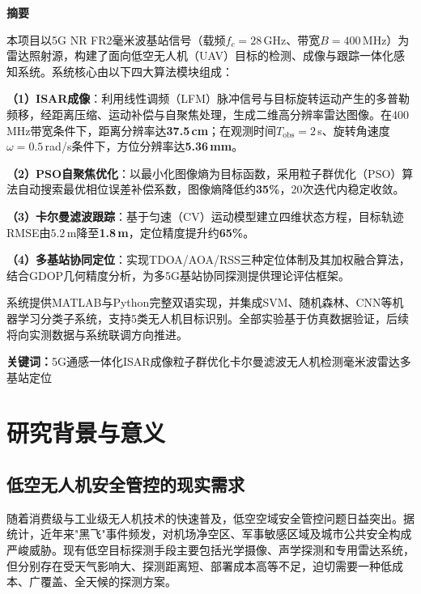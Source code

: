 \documentclass[12pt, a4paper]{article}
\begin{document}
\begin{infobox}
{\bfseries\large\color{primary} 摘\quad 要}

\medskip
本项目以5G NR FR2毫米波基站信号（载频$f_c=28\,$GHz、带宽$B=400\,$MHz）为雷达照射源，构建了面向低空无人机（UAV）目标的检测、成像与跟踪一体化感知系统。系统核心由以下四大算法模块组成：

\medskip
\textbf{（1）ISAR成像}：利用线性调频（LFM）脉冲信号与目标旋转运动产生的多普勒频移，经距离压缩、运动补偿与自聚焦处理，生成二维高分辨率雷达图像。在400\,MHz带宽条件下，距离分辨率达\textbf{37.5\,cm}；在观测时间$T_{\mathrm{obs}}=2\,$s、旋转角速度$\omega=0.5\,$rad/s条件下，方位分辨率达\textbf{5.36\,mm}。

\textbf{（2）PSO自聚焦优化}：以最小化图像熵为目标函数，采用粒子群优化（PSO）算法自动搜索最优相位误差补偿系数，图像熵降低约\textbf{35\%}，20次迭代内稳定收敛。

\textbf{（3）卡尔曼滤波跟踪}：基于匀速（CV）运动模型建立四维状态方程，目标轨迹RMSE由$5.2\,$m降至\textbf{1.8\,m}，定位精度提升约\textbf{65\%}。

\textbf{（4）多基站协同定位}：实现TDOA/AOA/RSS三种定位体制及其加权融合算法，结合GDOP几何精度分析，为多5G基站协同探测提供理论评估框架。

\medskip
系统提供MATLAB与Python完整双语实现，并集成SVM、随机森林、CNN等机器学习分类子系统，支持5类无人机目标识别。全部实验基于仿真数据验证，后续将向实测数据与系统联调方向推进。

\medskip
\textbf{关键词：}5G通感一体化\quad ISAR成像\quad 粒子群优化\quad 卡尔曼滤波\quad 无人机检测\quad 毫米波雷达\quad 多基站定位
\end{infobox}

\vspace{0.6cm}
\tableofcontents
\newpage

\section{研究背景与意义}

\subsection{低空无人机安全管控的现实需求}

随着消费级与工业级无人机技术的快速普及，低空空域安全管控问题日益突出。据统计，近年来"黑飞"事件频发，对机场净空区、军事敏感区域及城市公共安全构成严峻威胁\cite{ref_uav_threat}。现有低空目标探测手段主要包括光学摄像、声学探测和专用雷达系统，但分别存在受天气影响大、探测距离短、部署成本高等不足，迫切需要一种低成本、广覆盖、全天候的探测方案。
\end{document}
